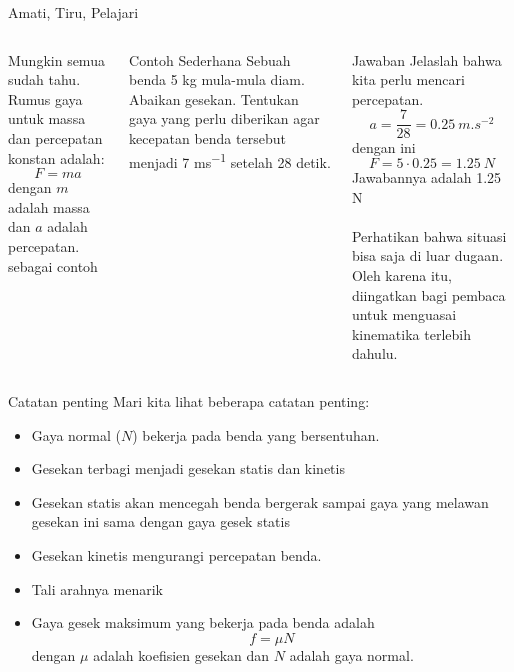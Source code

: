 \documentclass[10pt,aspectratio=54, handout]{beamer}
\begin{document}
  \begin{frame}{Amati, Tiru, Pelajari}
  \begin{columns}[c]
    
    
  
    Mungkin semua sudah tahu. Rumus gaya untuk massa dan percepatan konstan adalah:
    $$F = ma$$
    dengan $m$ adalah massa dan $a$ adalah percepatan. sebagai contoh
    \begin{exampleblock}{Contoh Sederhana}
      Sebuah benda 5 \unit{kg} mula-mula diam. Abaikan gesekan. Tentukan gaya yang perlu diberikan agar kecepatan benda tersebut menjadi 7 \unit{ms^{-1}} setelah 28 detik.
    \end{exampleblock}
    \begin{block}{Jawaban}
      Jelaslah bahwa kita perlu mencari percepatan.
      $$a = \frac{7}{28} = 0.25~\unit{m.s^{-2}}$$
      dengan ini 
      $$F = 5\cdot 0.25 = 1.25~\unit{N}$$
      Jawabannya adalah 1.25 \unit{N} \\~\\
      Perhatikan bahwa situasi bisa saja di luar dugaan. Oleh karena itu, diingatkan bagi pembaca untuk menguasai kinematika terlebih dahulu.
    \end{block}
    
    
  \end{columns}
  
  
  \end{frame}
  
  \begin{frame}{Catatan penting}
    Mari kita lihat beberapa catatan penting:
    \begin{itemize}
      \item Gaya normal ($N$) bekerja pada benda yang bersentuhan.
      \item Gesekan terbagi menjadi gesekan statis dan kinetis
      \item Gesekan statis akan mencegah benda bergerak sampai gaya yang melawan gesekan ini sama dengan gaya gesek statis
      \item Gesekan kinetis mengurangi percepatan benda.
      \item Tali arahnya menarik
      \item Gaya gesek maksimum yang bekerja pada benda adalah $$f = \mu N$$
      dengan $\mu$ adalah koefisien gesekan dan $N$ adalah gaya normal.
    \end{itemize}
  \end{frame}
  
\end{document}
